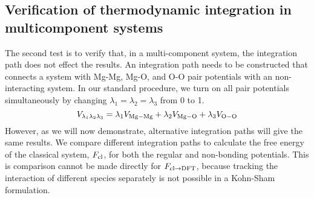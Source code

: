 \subsection{Verification of thermodynamic integration in multicomponent systems}

The second test is to verify that, in a multi-component system, the
integration path does not effect the results. An integration path needs to
be constructed that connects a system with Mg-Mg, Mg-O, and O-O pair
potentials with an non-interacting system. In our standard procedure, we
turn on all pair potentials simultaneously by changing
$\lambda_1=\lambda_2=\lambda_3$ from 0 to 1.
%
\begin{equation}
      V_{\lambda_1\lambda_2\lambda_3} = \lambda_1 V_{\rm Mg-Mg} + \lambda_2 V_{\rm
      Mg-O} + \lambda_3 V_{\rm O-O} 
\end{equation}
%
 However, as we will now demonstrate, alternative integration paths will give the
 same results. We compare different integration paths to calculate the free energy of
 the classical system, $F_{\rm cl}$, for both the regular and non-bonding potentials.
 This is comparison cannot be made directly for $F_{\rm cl \to DFT}$, because
 tracking the interaction of different species separately is not possible in a
 Kohn-Sham formulation.

